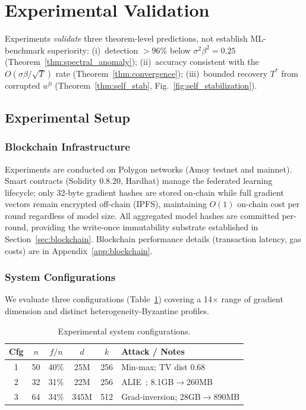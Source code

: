 \section{Experimental Validation}
\label{sec:experiments}

Experiments \emph{validate} three theorem-level predictions, not establish ML-benchmark superiority: (i)~detection $>96\%$ below $\sigma^2\beta^2{=}0.25$ (Theorem~\ref{thm:spectral_anomaly}); (ii)~accuracy consistent with the $O(\sigma\beta/\sqrt{T})$ rate (Theorem~\ref{thm:convergence}); (iii)~bounded recovery $T^*$ from corrupted $w^0$ (Theorem~\ref{thm:self_stab}, Fig.~\ref{fig:self_stabilization}).

\subsection{Experimental Setup}

\subsubsection{Blockchain Infrastructure}

Experiments are conducted on Polygon networks (Amoy testnet and mainnet).
Smart contracts (Solidity 0.8.20, Hardhat) manage the federated learning lifecycle;
only 32-byte gradient hashes are stored on-chain while full gradient vectors remain
encrypted off-chain (IPFS), maintaining $O(1)$ on-chain cost per round regardless of model size.
All aggregated model hashes are committed per-round, providing the write-once immutability substrate established in Section~\ref{sec:blockchain}.
Blockchain performance details (transaction latency, gas costs) are in Appendix~\ref{app:blockchain}.

\subsubsection{System Configurations}

We evaluate three configurations (Table~\ref{tab:configs}) covering a 14$\times$ range of
gradient dimension and distinct heterogeneity-Byzantine profiles.

\begin{table}[htbp]
\centering\small
\caption{Experimental system configurations.}
\label{tab:configs}
\setlength{\tabcolsep}{3pt}
\begin{tabular}{|c|c|c|c|c|l|}
\hline
\textbf{Cfg} & $n$ & $f/n$ & $d$ & $k$ & \textbf{Attack / Notes} \\
\hline
1 & 50 & 40\% & 25M & 256 & Min-max; TV dist 0.68 \\
2 & 32 & 31\% & 22M & 256 & ALIE~\cite{alie_attack}; 8.1GB$\to$260MB \\
3 & 64 & 34\% & 345M & 512 & Grad-inversion; 28GB$\to$890MB \\
\hline
\end{tabular}
\end{table}

